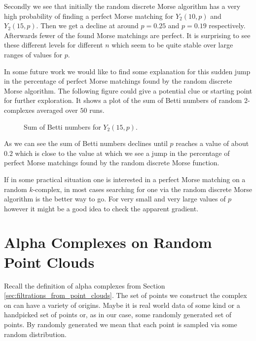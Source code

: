 Secondly we see that initially the random discrete Morse algorithm has a very high probability of finding a perfect Morse matching for $Y_2(10,p)$ and $Y_2(15,p)$. Then we get a  decline at around $p = 0.25$ and $p = 0.19$ respectively. Afterwards fewer of the found Morse matchings are perfect. It is surprising to see these different levels for different $n$ which seem to be quite stable over large ranges of values for $p$. 

In some future work we would like to find some explanation for this sudden jump in the percentage of perfect Morse matchings found by the random discrete Morse algorithm. The following figure could give a potential clue or starting point for further exploration. It shows a plot of the sum of Betti numbers of random $2$-complexes averaged over $50$ runs.

\begin{figure}[H]
\begin{subfigure}[c]{0.95\textwidth}
\begin{center}

\end{center}
\end{subfigure}
\caption{Sum of Betti numbers for $Y_2(15,p)$.}
\label{fig:summed_bettis}
\end{figure}

As we can see the sum of Betti numbers declines until $p$ reaches a value of about $0.2$ which is close to the value at which we see a jump in the percentage of perfect Morse matchings found by the random discrete Morse function. 

If in some practical situation one is interested in a perfect Morse matching on a random $k$-complex, in most cases searching for one via the random discrete Morse algorithm is the better way to go. For very small and very large values of $p$ however it might be a good idea to check the apparent gradient. 

\section{Alpha Complexes on Random Point Clouds}

Recall the definition of alpha complexes from Section \ref{sec:filtrations_from_point_clouds}. The set of points we construct the complex on can have a variety of origins. Maybe it is real world data of some kind or a handpicked set of points or, as in our case, some randomly generated set of points. By randomly generated we mean that each point is sampled via some random distribution. 

